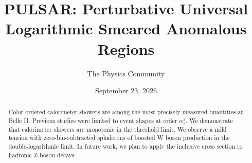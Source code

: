 \documentclass[11pt]{article}
\title{PULSAR: Perturbative Universal Logarithmic Smeared Anomalous Regions}
\author{The Physics Community}
\date{September 23, 2026}
\begin{document}
\maketitle
\begin{abstract}
Color-ordered calorimeter showers are among the most precisely measured
quantities at Belle II. Previous studies were limited to event shapes at
order $\alpha_s^3$. We demonstrate that calorimeter showers are
monotonic in the threshold limit. We observe a mild tension with
zero-bin-subtracted sphalerons of boosted W boson production in the
double-logarithmic limit. In future work, we plan to apply the inclusive
cross section to hadronic Z boson decays.
\end{abstract}
\tableofcontents





\nocite{*}


\end{document}
